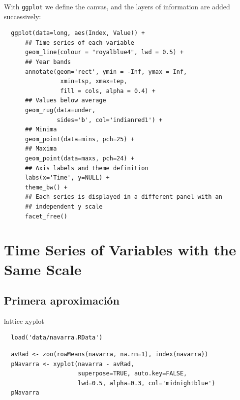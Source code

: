 \documentclass[xcolor={usenames,svgnames,dvipsnames}]{beamer}
\begin{document}
\begin{frame}[fragile,label=sec-2-2-7]{With \texttt{ggplot} we define the canvas, and the layers of information are}
 added successively:
\lstset{language=R,label= ,caption= ,numbers=none}
\begin{lstlisting}
  ggplot(data=long, aes(Index, Value)) +
      ## Time series of each variable
      geom_line(colour = "royalblue4", lwd = 0.5) +
      ## Year bands
      annotate(geom='rect', ymin = -Inf, ymax = Inf,
                xmin=tsp, xmax=tep,
                fill = cols, alpha = 0.4) +
      ## Values below average
      geom_rug(data=under,
               sides='b', col='indianred1') +
      ## Minima
      geom_point(data=mins, pch=25) +
      ## Maxima
      geom_point(data=maxs, pch=24) +
      ## Axis labels and theme definition
      labs(x='Time', y=NULL) +
      theme_bw() +
      ## Each series is displayed in a different panel with an
      ## independent y scale
      facet_free()
\end{lstlisting}
\end{frame}


\section{Time Series of Variables with the Same Scale}
\label{sec-3}

\subsection{Primera aproximación}
\label{sec-3-1}
\begin{frame}[fragile,label=sec-3-1-1]{lattice xyplot}
 \lstset{language=R,label= ,caption= ,numbers=none}
\begin{lstlisting}
  load('data/navarra.RData')
\end{lstlisting}

\lstset{language=R,label= ,caption= ,numbers=none}
\begin{lstlisting}
  avRad <- zoo(rowMeans(navarra, na.rm=1), index(navarra))
  pNavarra <- xyplot(navarra - avRad,
                     superpose=TRUE, auto.key=FALSE,
                     lwd=0.5, alpha=0.3, col='midnightblue') 
  pNavarra
\end{lstlisting}
\end{frame}
\end{document}
